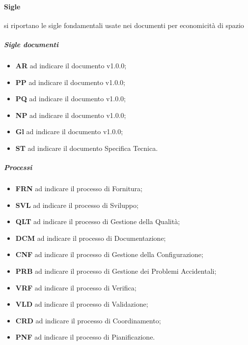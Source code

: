             \paragraph{Sigle}
                si riportano le sigle fondamentali usate nei documenti per economicità di spazio
                \subparagraph{Sigle documenti}
                    \begin{itemize}
                        \item\textbf{AR} ad indicare il documento  v1.0.0;
                        \item\textbf{PP} ad indicare il documento  v1.0.0;
                        \item\textbf{PQ} ad indicare il documento  v1.0.0;
                        \item\textbf{NP} ad indicare il documento  v1.0.0;
                        \item\textbf{Gl} ad indicare il documento  v1.0.0;
                        \item\textbf{ST} ad indicare il documento Specifica Tecnica.
                    \end{itemize}
                \subparagraph{Processi}
                    \begin{itemize}
                        \item\textbf{FRN} ad indicare il processo di Fornitura;
                        \item\textbf{SVL} ad indicare il processo di Sviluppo;
                        \item\textbf{QLT} ad indicare il processo di Gestione della Qualità;
                        \item\textbf{DCM} ad indicare il processo di Documentazione;
                        \item\textbf{CNF} ad indicare il processo di Gestione della Configurazione;
                        \item\textbf{PRB} ad indicare il processo di Gestione dei Problemi Accidentali;
                        \item\textbf{VRF} ad indicare il processo di Verifica;
                        \item\textbf{VLD} ad indicare il processo di Validazione;
                        \item\textbf{CRD} ad indicare il processo di Coordinamento;
                        \item\textbf{PNF} ad indicare il processo di Pianificazione.
                    \end{itemize}
